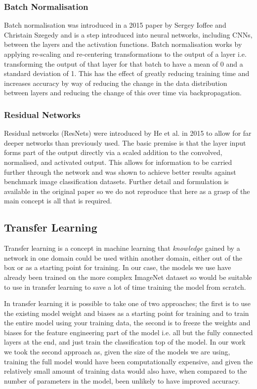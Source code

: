 \documentclass[12pt]{article}
\numberwithin{equation}{section}
\numberwithin{figure}{section}
\begin{document}
\subsubsection{Batch Normalisation}
Batch normalisation was introduced in a 2015 paper by Sergey Ioffee and Christain Szegedy\cite{Ioffe2015} and is a step introduced into neural networks, including CNNs, between the layers and the activation functions. Batch normalisation works by applying re-scaling and re-centering transformations to the output of a layer i.e. transforming the output of that layer for that batch to have a mean of 0 and a standard deviation of 1. This has the effect of greatly reducing training time and increases accuracy by way of reducing the change in the data distribution between layers and reducing the change of this over time via backpropagation. 

\subsubsection{Residual Networks}
Residual networks (ResNets) were introduced by He et al. in 2015\cite{He2015a} to allow for far deeper networks than previously used. The basic premise is that the layer input forms part of the output directly via a scaled addition to the convolved, normalised, and activated output. This allows for information to be carried further through the network and was shown to achieve better results against benchmark image classification datasets. Further detail and formulation is available in the original paper so we do not reproduce that here as a grasp of the main concept is all that is required.

\subsection{Transfer Learning} 
\label{sub:Transfer_Learning} 
Transfer learning is a concept in machine learning that \emph{knowledge} gained by a network in one domain could be used within another domain, either out of the box or as a starting point for training. In our case, the models we use have already been trained on the more complex ImageNet dataset so would be suitable to use in transfer learning to save a lot of time training the model from scratch.


In transfer learning it is possible to take one of two approaches; the first is to use the existing model weight and biases as a starting point for training and to train the entire model using your training data, the second is to freeze the weights and biases for the feature engineering part of the model i.e. all but the fully connected layers at the end, and just train the classification top of the model. In our work we took the second approach as, given the size of the models we are using, training the full model would have been computationally expensive, and given the relatively small amount of training data would also have, when compared to the number of parameters in the model, been unlikely to have improved accuracy.
\end{document}
